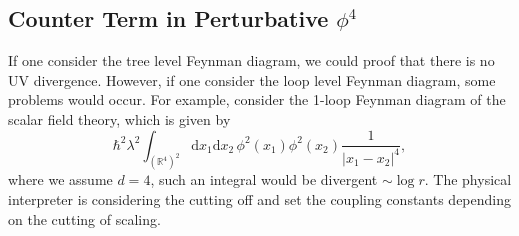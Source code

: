\documentclass[10pt]{article}
\begin{document}

\subsection{\texorpdfstring{Counter Term in Perturbative $\phi^{4}$}{ Counter Term in Perturbative phi^4}}

If one consider the tree level Feynman diagram, we could proof that there is no UV divergence. However, if one consider the loop level Feynman diagram, some problems would occur. For example, consider the 1-loop Feynman diagram of the scalar field theory, which is given by
\begin{equation*}
  \hbar^{2} \lambda^{2} \int _{(\mathbb{R}^{4})^{2}} \mathrm{d} x_1 \mathrm{d} x_2 \, \phi^{2}(x_1) \phi^{2}(x_2) \frac{1}{\left| x_1 - x_2 \right|^{4}},
\end{equation*}
where we assume $ d=4$, such an integral would be divergent $ \sim \log r$. The physical interpreter is considering the cutting off and set the coupling constants depending on the cutting of scaling.
\end{document}
